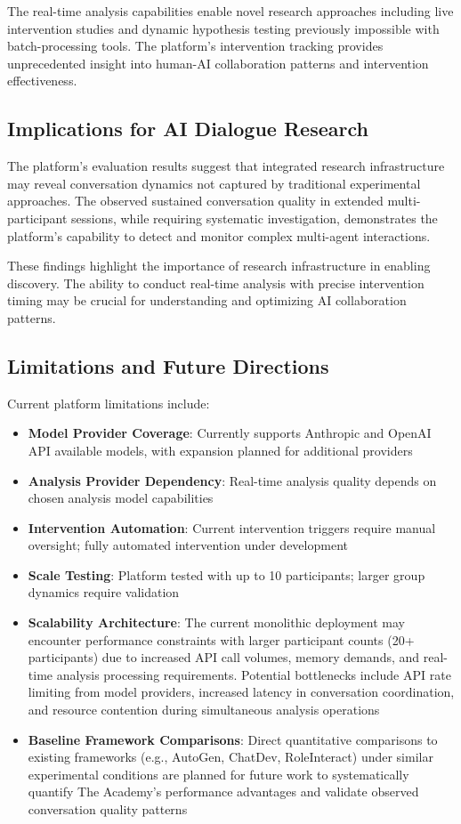 \documentclass[11pt,letterpaper]{article}
\begin{document}
The real-time analysis capabilities enable novel research approaches including live intervention studies and dynamic hypothesis testing previously impossible with batch-processing tools. The platform's intervention tracking provides unprecedented insight into human-AI collaboration patterns and intervention effectiveness.

\subsection{Implications for AI Dialogue Research}

The platform's evaluation results suggest that integrated research infrastructure may reveal conversation dynamics not captured by traditional experimental approaches. The observed sustained conversation quality in extended multi-participant sessions, while requiring systematic investigation, demonstrates the platform's capability to detect and monitor complex multi-agent interactions.

These findings highlight the importance of research infrastructure in enabling discovery. The ability to conduct real-time analysis with precise intervention timing may be crucial for understanding and optimizing AI collaboration patterns.

\subsection{Limitations and Future Directions}

Current platform limitations include:

\begin{itemize}
    \item \textbf{Model Provider Coverage}: Currently supports Anthropic and OpenAI API available models, with expansion planned for additional providers
    \item \textbf{Analysis Provider Dependency}: Real-time analysis quality depends on chosen analysis model capabilities
    \item \textbf{Intervention Automation}: Current intervention triggers require manual oversight; fully automated intervention under development
    \item \textbf{Scale Testing}: Platform tested with up to 10 participants; larger group dynamics require validation
    \item \textbf{Scalability Architecture}: The current monolithic deployment may encounter performance constraints with larger participant counts (20+ participants) due to increased API call volumes, memory demands, and real-time analysis processing requirements. Potential bottlenecks include API rate limiting from model providers, increased latency in conversation coordination, and resource contention during simultaneous analysis operations
    \item \textbf{Baseline Framework Comparisons}: Direct quantitative comparisons to existing frameworks (e.g., AutoGen, ChatDev, RoleInteract) under similar experimental conditions are planned for future work to systematically quantify The Academy's performance advantages and validate observed conversation quality patterns
\end{itemize}
\end{document}
